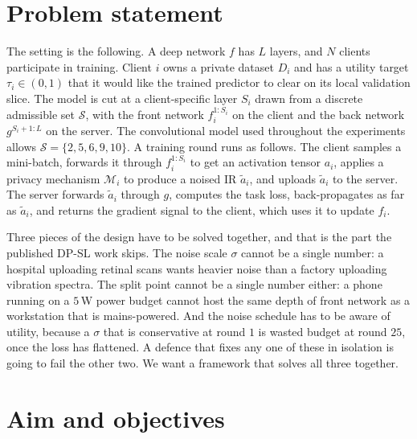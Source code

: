 \documentclass[11pt,a4paper,oneside]{report}
\begin{document}
\section{Problem statement}

The setting is the following. A deep network $f$ has $L$ layers, and
$N$ clients participate in training. Client $i$ owns a private dataset
$D_i$ and has a utility target $\tau_i \in (0,1)$ that it would like
the trained predictor to clear on its local validation slice. The
model is cut at a client-specific layer $S_i$ drawn from a discrete
admissible set $\mathcal{S}$, with the front network
$f_i^{1:S_i}$ on the client and the back network $g^{S_i+1:L}$ on the
server. The convolutional model used throughout the experiments allows
$\mathcal{S} = \{2,5,6,9,10\}$. A training round runs as follows.
The client samples a mini-batch, forwards it through $f_i^{1:S_i}$ to
get an activation tensor $a_i$, applies a privacy mechanism
$\mathcal{M}_i$ to produce a noised IR $\tilde{a}_i$, and uploads
$\tilde{a}_i$ to the server. The server forwards $\tilde{a}_i$ through
$g$, computes the task loss, back-propagates as far as
$\tilde{a}_i$, and returns the gradient signal to the client, which
uses it to update $f_i$.

Three pieces of the design have to be solved together, and that is
the part the published DP-SL work skips. The noise scale $\sigma$
cannot be a single number: a hospital uploading retinal scans wants
heavier noise than a factory uploading vibration spectra. The split
point cannot be a single number either: a phone running on a $5$\,W
power budget cannot host the same depth of front network as a
workstation that is mains-powered. And the noise schedule has to be
aware of utility, because a $\sigma$ that is conservative at round $1$
is wasted budget at round $25$, once the loss has flattened. A defence
that fixes any one of these in isolation is going to fail the other
two. We want a framework that solves all three together.

\section{Aim and objectives}
\end{document}
